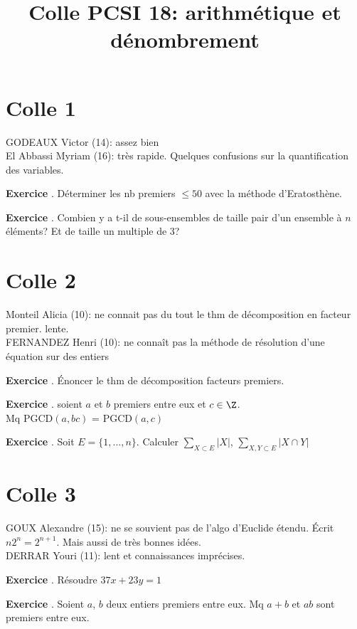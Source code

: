 \documentclass[10pt,a4paper]{article}
\title{Colle PCSI 18: arithmétique et dénombrement}
\newcounter{question}
\newcounter{exo}
\newenvironment{exo}{\vspace{0.5cm}\setcounter{question}{0}\addtocounter{exo}{1} \noindent \textbf{Exercice \theexo}. \normalsize }{\par}
\begin{document}
	\maketitle
\section*{Colle 1}
\setcounter{exo}{0}
	GODEAUX Victor (14): assez bien\\
	El Abbassi Myriam (16): très rapide. Quelques confusions sur la quantification des variables.\\
	
	\begin{exo}
		Déterminer les nb premiers $\leq 50$ avec la méthode d'Eratosthène.
	\end{exo}
	
	\begin{exo}
		Combien y a t-il de sous-ensembles de taille pair d'un ensemble à $n$ éléments? Et de taille un multiple de 3?
	\end{exo}

	\section*{Colle 2}
	Monteil Alicia (10): ne connait pas du tout le thm de décomposition en facteur premier. lente.\\
	FERNANDEZ Henri (10): ne connaît pas la méthode de résolution d'une équation sur des entiers\\
	
	\begin{exo}
		Énoncer le thm de décomposition facteurs premiers.
	\end{exo}
			
	\begin{exo}
		soient $a$ et $b$ premiers entre eux et $c\in  \Z$.\\
		Mq PGCD$(a, bc)$ = PGCD$(a, c)$
	\end{exo}	

	\begin{exo}
		Soit $E = \lbrace 1, ..., n \rbrace$. Calculer $\sum_{X \subset E} \vert X \vert$, $\sum_{X, Y \subset E} \vert X \cap Y \vert$
	\end{exo}	


	\section*{Colle 3}
	\setcounter{exo}{0}
	GOUX Alexandre (15): ne se souvient pas de l'algo d'Euclide étendu. Écrit $n 2^n = 2^{n+1}$. Mais aussi de très bonnes idées.\\
	DERRAR Youri (11): lent et connaissances imprécises.\\
	\begin{exo}
		Résoudre $37x+23y = 1$
	\end{exo}
	
	\begin{exo}
		Soient $a$, $b$ deux entiers premiers entre eux. Mq $a+b$ et $ab$ sont premiers entre eux.
	\end{exo}
	
\end{document}
